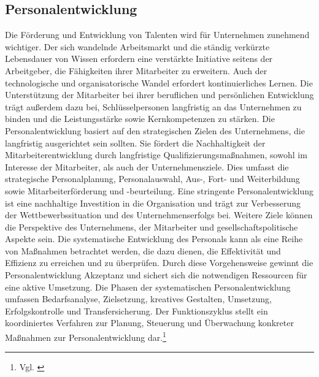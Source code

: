 \subsection{Personalentwicklung}
Die Förderung und Entwicklung von Talenten wird für Unternehmen zunehmend wichtiger. Der sich wandelnde Arbeitsmarkt und die ständig verkürzte Lebensdauer von Wissen erfordern eine verstärkte Initiative seitens der Arbeitgeber, die Fähigkeiten ihrer Mitarbeiter zu erweitern. Auch der technologische und organisatorische Wandel erfordert kontinuierliches Lernen. Die Unterstützung der Mitarbeiter bei ihrer beruflichen und persönlichen Entwicklung trägt außerdem dazu bei, Schlüsselpersonen langfristig an das Unternehmen zu binden und die Leistungsstärke sowie Kernkompetenzen zu stärken. Die Personalentwicklung basiert auf den strategischen Zielen des Unternehmens, die langfristig ausgerichtet sein sollten. Sie fördert die Nachhaltigkeit der Mitarbeiterentwicklung durch langfristige Qualifizierungsmaßnahmen, sowohl im Interesse der Mitarbeiter, als auch der Unternehmensziele. Dies umfasst die strategische Personalplanung, Personalauswahl, Aus-, Fort- und Weiterbildung sowie Mitarbeiterförderung und -beurteilung. Eine stringente Personalentwicklung ist eine nachhaltige Investition in die Organisation und trägt zur Verbesserung der Wettbewerbssituation und des Unternehmenserfolgs bei. Weitere Ziele können die Perspektive des Unternehmens, der Mitarbeiter und gesellschaftspolitische Aspekte sein. Die systematische Entwicklung des Personals kann als eine Reihe von Maßnahmen betrachtet werden, die dazu dienen, die Effektivität und Effizienz zu erreichen und zu überprüfen. Durch diese Vorgehensweise gewinnt die Personalentwicklung Akzeptanz und sichert sich die notwendigen Ressourcen für eine aktive Umsetzung. Die Phasen der systematischen Personalentwicklung umfassen Bedarfsanalyse, Zielsetzung, kreatives Gestalten, Umsetzung, Erfolgskontrolle und Transfersicherung. Der Funktionszyklus stellt ein koordiniertes Verfahren zur Planung, Steuerung und Überwachung konkreter Maßnahmen zur Personalentwicklung dar.\footnote{Vgl. \cite{Bartscher2021}}

